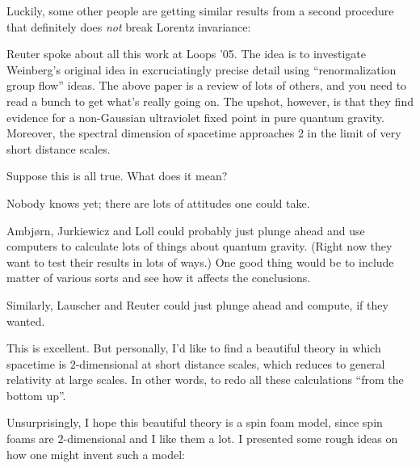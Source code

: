 \documentclass{article}
\def\tightlist{}
\renewcommand{\texttt}[1]{%
  \begingroup
  \ttfamily
  \begingroup\lccode`~=`/\lowercase{\endgroup\def~}{/\discretionary{}{}{}}%
  \begingroup\lccode`~=`[\lowercase{\endgroup\def~}{[\discretionary{}{}{}}%
  \begingroup\lccode`~=`.\lowercase{\endgroup\def~}{.\discretionary{}{}{}}%
  \catcode`/=\active\catcode`[=\active\catcode`.=\active
  \scantokens{#1\noexpand}%
  \endgroup
}
\begin{document}
Luckily, some other people are getting similar results from a second
procedure that definitely does \emph{not} break Lorentz invariance:


Reuter spoke about all this work at Loops '05. The idea is to
investigate Weinberg's original idea in excruciatingly precise detail
using ``renormalization group flow'' ideas. The above paper is a review
of lots of others, and you need to read a bunch to get what's really
going on. The upshot, however, is that they find evidence for a
non-Gaussian ultraviolet fixed point in pure quantum gravity. Moreover,
the spectral dimension of spacetime approaches 2 in the limit of very
short distance scales.

Suppose this is all true. What does it mean?

Nobody knows yet; there are lots of attitudes one could take.

Ambjørn, Jurkiewicz and Loll could probably just plunge ahead and use
computers to calculate lots of things about quantum gravity. (Right now
they want to test their results in lots of ways.) One good thing would
be to include matter of various sorts and see how it affects the
conclusions.

Similarly, Lauscher and Reuter could just plunge ahead and compute, if
they wanted.

This is excellent. But personally, I'd like to find a beautiful theory
in which spacetime is \(2\)-dimensional at short distance scales, which
reduces to general relativity at large scales. In other words, to redo
all these calculations ``from the bottom up''.

Unsurprisingly, I hope this beautiful theory is a spin foam model, since
spin foams are \(2\)-dimensional and I like them a lot. I presented some
rough ideas on how one might invent such a model:

\end{document}
